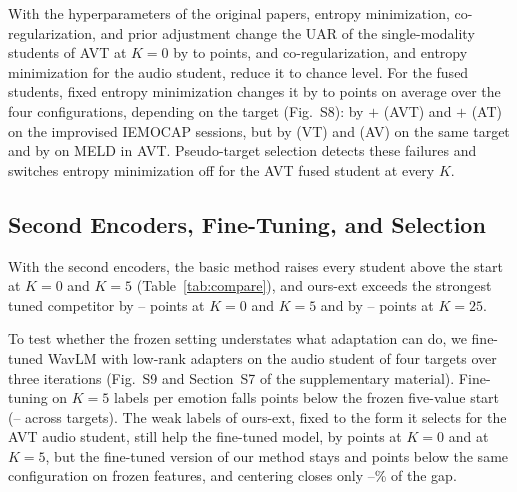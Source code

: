 With the hyperparameters of the original papers, entropy minimization, co-regularization, and prior adjustment change the UAR of the single-modality students of AVT at $K=0$ by  to  points, and co-regularization, and entropy minimization for the audio student, reduce it to chance level.
For the fused students, fixed entropy minimization changes it by  to  points on average over the four configurations, depending on the target (Fig.~S8): by $+$ (AVT) and $+$ (AT) on the improvised IEMOCAP sessions, but by  (VT) and  (AV) on the same target and by  on MELD in AVT.
Pseudo-target selection detects these failures and switches entropy minimization off for the AVT fused student at every $K$.


\subsection{Second Encoders, Fine-Tuning, and Selection}
\label{sec:comparison-robust}

With the second encoders, the basic method raises every student above the start at $K=0$ and $K=5$ (Table~\ref{tab:compare}), and ours-ext exceeds the strongest tuned competitor by -- points at $K=0$ and $K=5$ and by -- points at $K=25$.

To test whether the frozen setting understates what adaptation can do, we fine-tuned WavLM with low-rank adapters on the audio student of four targets over three iterations (Fig.~S9 and Section~S7 of the supplementary material).
Fine-tuning on $K=5$ labels per emotion falls  points below the frozen five-value start (-- across targets).
The weak labels of ours-ext, fixed to the form it selects for the AVT audio student, still help the fine-tuned model, by  points at $K=0$ and  at $K=5$, but the fine-tuned version of our method stays  and  points below the same configuration on frozen features, and centering closes only --\% of the gap.


